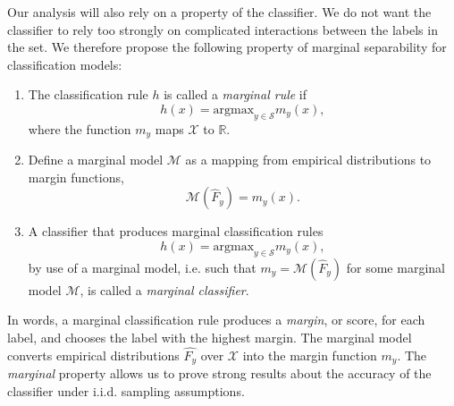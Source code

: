 Our analysis will also rely on a property of the classifier. We do not
want the classifier to rely too strongly on complicated interactions
between the labels in the set. We therefore propose the following
property of marginal separability for classification models:

\begin{definition}
\begin{enumerate}
\item The classification rule $h$ is called a \emph{marginal rule} if 
\[
h(x) = \text{argmax}_{y \in \mathcal{S}} m_y(x),
\]
where the function $m_y$ maps $\mathcal{X}$ to $\mathbb{R}$. 
\item Define a marginal model $\mathcal{M}$ as a mapping from empirical distributions
to margin functions,
\[
\mathcal{M}(\hat{F}_y) = m_y(x).
\]
\item A classifier that produces marginal classification rules
\[
h(x) = \text{argmax}_{y \in \mathcal{S}} m_y(x),
\]
by use of a marginal model, i.e. such that
$m_y=\mathcal{M}(\hat{F}_y)$ for some marginal model $\mathcal{M}$,
is called a \emph{marginal classifier}.
\end{enumerate}
\end{definition}
In words, a marginal classification rule produces a \emph{margin}, or
score, for each label, and chooses the label with the highest
margin. The marginal model converts empirical distributions
$\hat{F_y}$ over $\mathcal{X}$ into the margin function
$m_y$.  The \emph{marginal} property allows us to prove strong results
about the accuracy of the classifier under i.i.d. sampling assumptions.

